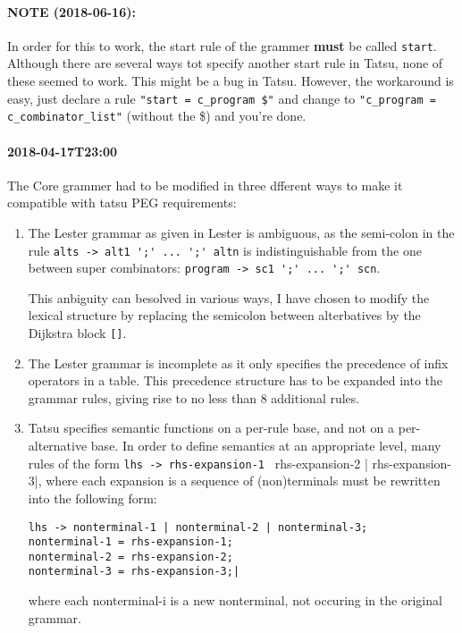 \documentclass[11pt, a4paper]{article}
\begin{document}
\paragraph{NOTE (2018-06-16):} In order for this to work, the start rule of the grammer \textbf{must} be called \verb|start|. 
Although there are several ways tot specify another start rule in Tatsu, none of these seemed to work. 
This might be a bug in Tatsu. 
However, the workaround is easy, just declare a rule \verb|"start = c_program $"| and change to \verb|"c_program = c_combinator_list"| (without the \$) and you're done.

\paragraph{2018-04-17T23:00}

The Core grammer had to be modified in three dfferent ways to make it compatible with tatsu PEG requirements:

\begin{enumerate}

\item The Lester grammar as given in Lester is ambiguous, as the semi-colon in the rule 
\verb|alts -> alt1 ';' ... ';' altn|
is indistinguishable from the one between super combinators:
\verb|program -> sc1 ';' ... ';' scn|.

This anbiguity can besolved in various ways, I have chosen to modify the lexical structure by replacing the semicolon between alterbatives by the Dijkstra block \verb|[]|.

\item The Lester grammar is incomplete as it only specifies the precedence of infix operators in a table. This precedence structure has to be expanded into the grammar rules, giving rise to no less than 8 additional rules.

\item Tatsu specifies semantic functions on a per-rule base, and not on a per-alternative base. In order to define semantics at an appropriate level, many rules of the form
\verb|lhs -> rhs-expansion-1 | rhs-expansion-2 | rhs-expansion-3|, 
where each expansion is a sequence of (non)terminals must be rewritten into the following form:

\begin{Verbatim}
lhs -> nonterminal-1 | nonterminal-2 | nonterminal-3;
nonterminal-1 = rhs-expansion-1;
nonterminal-2 = rhs-expansion-2;
nonterminal-3 = rhs-expansion-3;|
\end{Verbatim}
where each nonterminal-i is a new nonterminal, not occuring in the original grammar.
\end{enumerate}
\end{document}
